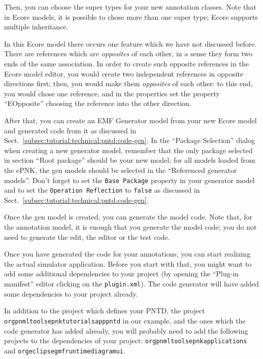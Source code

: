 Then, you can choose the super types for your new annotation classes. Note that
in Ecore models, it is possible to chose more than one super type; Ecore
supports multiple inheritance.

In this Ecore model there occurs one feature which we have not
discussed before. There are references which are \emph{opposites} of each other,
in a sense they form two ends of the same association. In order to create such
opposite references in the Ecore model editor, you would create two independent
references in opposite directions first; then, you would make them
\emph{opposites} of each other:
to this end, you would chose one reference, and in the properties set the
property ``EOpposite'' choosing the reference into the other direction.

After that, you can create an EMF Generator model from your new Ecore model and
generated code from it as discussed in
Sect.~\ref{subsec:tutorial:technical:pntd:code-gen}. In the ``Package
Selection'' dialog when creating a new generator model, remember that the only
package selected in section ``Root package'' should be your new model; for all
models loaded from the ePNK, the gen models should be selected in the
``Referenced generator models''. Don't forget to set the {\tt Base Package}
property in your generator model and to set the {\tt Operation Reflection} to
{\tt false} as discussed in Sect.~\ref{subsec:tutorial:technical:pntd:code-gen}.

Once the gen model is created, you can generate the model code. Note that, for
the annotation model, it is enough that you generate the model code; you do not
need to generate the edit, the editor or the test code.

Once you have generated the code for your annotations, you can start realizing
the actual simulator application. Before you start with that, you might want to
add some additional dependencies to your project (by opening the  ``Plug-in
manifest'' editor clicking on the {\tt plugin.xml}). The code generator will
have added some dependencies to your project already.

In addition to the project which defines your PNTD, the project {\tt
org\qnsep{}pnml\qnsep{}tools\qnsep{}epnk\qnsep{}tutorials\qnsep{}app\qnsep{}pntd}
in our example, and the ones which the code generator has added already, you
will probably need to add the following projects to the dependencies of your
project:
{\tt org\qnsep{}pnml\qnsep{}tools\qnsep{}epnk\qnsep{}applications} and
{\tt org\qnsep{}eclipse\qnsep{}gmf\qnsep{}runtime\qnsep{}diagram\qnsep{}ui}.

